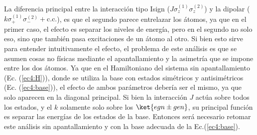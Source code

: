 La diferencia principal entre la interacción tipo Isign ($J\sigma_z^{(1)}\sigma_z^{(2)}$) y la dipolar ($k\sigma_+^{(1)}\sigma_-^{(2)}+\text{c.c.}$), es que el segundo parece entrelazar los átomos, ya que en el primer caso, el efecto es separar los niveles de energía, pero en el segundo no solo eso, sino que también pasa excitaciones de un átomo al otro. Si bien esto sirve para entender intuitivamente el efecto, el problema de este análisis es que se asumen cosas no físicas mediante el apantallamiento y la asimetría que se impone entre los dos átomos. Ya que en el Hamiltoniano del sistema sin apantallamiento (Ec. (\ref{ec4:H})), donde se utiliza la base con estados simétricos y antisimétricos (Ec. (\ref{ec4:base})), el efecto de ambos parámetros debería ser el mismo, ya que solo aparecen en la diagonal principal. Si bien la interacción $J$ actúa sobre todos los estados, y el $k$ solamente solo sobre los $\ket{egn\pm gen}$, su principal función es separar las energías de los estados de la base.
Entonces será necesario retomar este análisis sin apantallamiento y con la base adecuada de la Ec.(\ref{ec4:base}).

